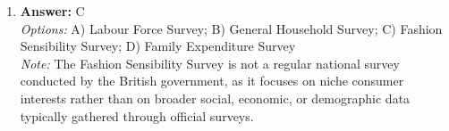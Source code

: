 \documentclass[12pt]{article}
\begin{document}
\begin{enumerate}[label=\arabic*.]
\\ \textit{Options:} A) Functionalism; B) Conflict theory; C) Symbolic interactionism; D) Role theory
\\ \textit{Note:} Functionalism is the correct answer because it emphasizes how various components of society work together in a coordinated manner to maintain stability and social order, viewing society as an interdependent system.
\item \textbf{Answer:} C
\\ \textit{Options:} A) Labour Force Survey; B) General Household Survey; C) Fashion Sensibility Survey; D) Family Expenditure Survey
\\ \textit{Note:} The Fashion Sensibility Survey is not a regular national survey conducted by the British government, as it focuses on niche consumer interests rather than on broader social, economic, or demographic data typically gathered through official surveys.
\end{enumerate}
\end{document}
